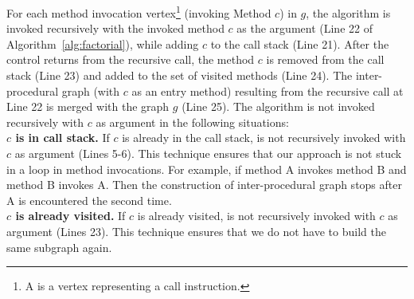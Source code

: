 For each method invocation vertex\footnote{\scriptsize{A  is a vertex representing a call instruction.}} (invoking Method $c$) in $g$, the algorithm  is invoked recursively with the invoked method $c$ as the argument (Line 22 of Algorithm~\ref{alg:factorial}), while adding $c$ to the call stack (Line 21). After the control returns from the recursive call, the method $c$ is removed from the call stack (Line 23) and added to the set of visited methods (Line 24). The inter-procedural graph  (with $c$ as an entry method) resulting from the recursive call at Line 22 is merged with the graph $g$ (Line 25).
The algorithm  is not invoked recursively with $c$ as argument in the following situations:
\\ \textbf{$c$ is in call stack.} If $c$ is already in the call stack,  is not recursively invoked with $c$ as argument (Lines 5-6). This technique ensures that our approach is not stuck in a loop in method invocations. For example, if method A invokes method B and method B invokes A. Then the construction of inter-procedural graph stops after A is encountered the second time.
\\ \textbf{ $c$ is already visited.} If $c$ is already visited,  is not recursively invoked with $c$ as argument (Lines 23). This technique ensures that we do not have to build the same subgraph again.
